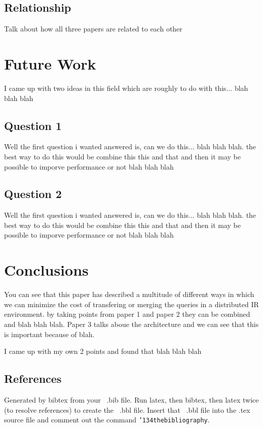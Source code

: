 \documentclass{acm_proc_article-sp}
\begin{document}
\subsection{Relationship}
Talk about how all three papers are related to each other

\section{Future Work}
I came up with two ideas in this field which are roughly to do with this... blah blah blah

\subsection{Question 1}
Well the first question i wanted answered is, can we do this... blah blah blah. the best way to do this would be combine this this and that and then it may be possible to imporve performance or not blah blah blah

\subsection{Question 2}
Well the first question i wanted answered is, can we do this... blah blah blah. the best way to do this would be combine this this and that and then it may be possible to imporve performance or not blah blah blah

\section{Conclusions}
You can see that this paper has described a multitude of different ways in which we can minimize the cost of transfering or merging the queries in a distributed IR environment. by taking points from paper 1 and paper 2 they can be combined and blah blah blah. Paper 3 talks aboue the architecture and we can see that this is important because of blah.

I came up with my own 2 points and found that blah blah blah


 

\subsection{References}
Generated by bibtex from your ~.bib file.  Run latex,
then bibtex, then latex twice (to resolve references)
to create the ~.bbl file.  Insert that ~.bbl file into
the .tex source file and comment out
the command \texttt{{\char'134}thebibliography}.
\balancecolumns
\end{document}
